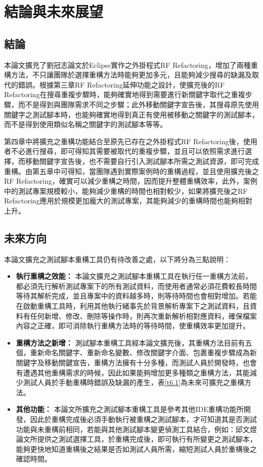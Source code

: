 \chapter{結論與未來展望}
\section{結論}
\indent
本論文擴充了劉冠志論文\cite{LIU-Thesis}於Eclipse實作之外掛程式RF Refactoring，增加了兩種重構方法，不只讓團隊於選擇重構方法時能夠更加多元，且能夠減少搜尋的缺漏及取代的錯誤。根據第三章RF Refactoring延伸功能之設計，使擴充後的RF Refactoring在搜尋重複步驟時，能夠確實地得到需要進行新關鍵字取代之重複步驟，而不是得到與團隊需求不同之步驟；此外移動關鍵字宣告後，其搜尋原先使用關鍵字之測試腳本時，也能夠確實地得到真正有使用被移動之關鍵字的測試腳本，而不是得到使用類似名稱之關鍵字的測試腳本等等。

\indent
第四章中將擴充之重構功能結合至原先已存在之外掛程式RF Refactoring後，使用者不必進行搜尋，即可得知其需要被取代的重複步驟，並且可以依照需求進行選擇，而移動關鍵字宣告後，也不需要自行引入測試腳本所需之測試資源，即可完成重構。由第五章中可得知，當團隊遇到實際案例時的重構過程，並且使用擴充後之RF Refactoring，確實可以減少重構之時間，因而提升整體重構效率，此外，案例中的測試專案規模較小，能夠減少重構的時間也相對較少，如果將擴充後之RF Refactoring應用於規模更加龐大的測試專案，其能夠減少的重構時間也能夠相對上升。
\newpage

\section{未來方向}
\indent
本論文擴充之測試腳本重構工具仍有待改善之處，以下將分為三點說明：

\begin{itemize}

\item\textbf{執行重構之效能：}
本論文擴充之測試腳本重構工具在執行任一重構方法前，都必須先行解析測試專案下的所有測試資料，而使用者通常必須花費較長時間等待其解析完成，並且專案中的資料越多時，則等待時間也會相對增加。若能在啟動重構工具時，利用其他執行緒事先於背景解析專案下之測試資料，且資料有任何新增、修改、刪除等操作時，則再次重新解析相對應資料，確保檔案內容之正確，即可消除執行重構方法時的等待時間，使重構效率更加提升。

\item\textbf{重構方法之新增：}
測試腳本重構工具經本論文擴充後，其重構方法目前有五個，重新命名關鍵字、重新命名變數、修改關鍵字介面、包裹重複步驟成為新關鍵字及移動關鍵宣告，重構方法擁有十分多種，而測試人員於開發時，也會有遭遇其他重構需求的時候，因此如果能夠增加更多種類之重構方法，其能減少測試人員於手動重構時錯誤及缺漏的產生，表\ref{t6.1}為未來可擴充之重構方法。

\item\textbf{其他功能：}
本論文所擴充之測試腳本重構工具是參考其他IDE重構功能所開發，因此於重構完成後必須手動執行被重構之測試腳本，才可知道其是否測試功能與未重構前相同，若能與其他測試腳本變更偵測工具結合，例如：邱文煜論文\cite{CHIU-Thesis}所提供之測試選擇工具，於重構完成後，即可執行有所變更之測試腳本，能夠更快地知道重構後之結果是否如測試人員所需，縮短測試人員於重構後之確認時間。

\end{itemize}

